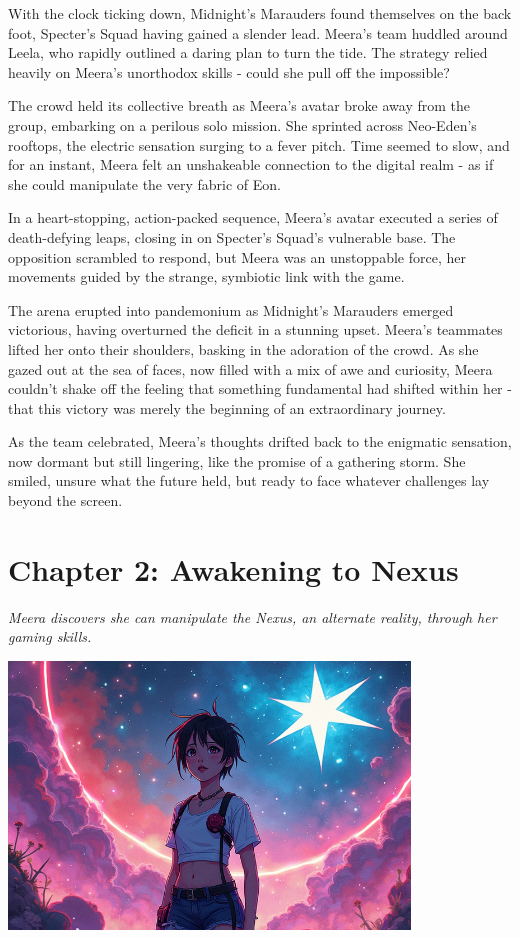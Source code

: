 \documentclass[12pt]{book}
\begin{document}
With the clock ticking down, Midnight's Marauders found themselves on
the back foot, Specter's Squad having gained a slender lead. Meera's
team huddled around Leela, who rapidly outlined a daring plan to turn
the tide. The strategy relied heavily on Meera's unorthodox skills -
could she pull off the impossible?

The crowd held its collective breath as Meera's avatar broke away from
the group, embarking on a perilous solo mission. She sprinted across
Neo-Eden's rooftops, the electric sensation surging to a fever pitch.
Time seemed to slow, and for an instant, Meera felt an unshakeable
connection to the digital realm - as if she could manipulate the very
fabric of Eon.

In a heart-stopping, action-packed sequence, Meera's avatar executed a
series of death-defying leaps, closing in on Specter's Squad's
vulnerable base. The opposition scrambled to respond, but Meera was an
unstoppable force, her movements guided by the strange, symbiotic link
with the game.

The arena erupted into pandemonium as Midnight's Marauders emerged
victorious, having overturned the deficit in a stunning upset. Meera's
teammates lifted her onto their shoulders, basking in the adoration of
the crowd. As she gazed out at the sea of faces, now filled with a mix
of awe and curiosity, Meera couldn't shake off the feeling that
something fundamental had shifted within her - that this victory was
merely the beginning of an extraordinary journey.

As the team celebrated, Meera's thoughts drifted back to the enigmatic
sensation, now dormant but still lingering, like the promise of a
gathering storm. She smiled, unsure what the future held, but ready to
face whatever challenges lay beyond the screen.


\newpage

\chapter*{Chapter 2: Awakening to Nexus}
\textit{Meera discovers she can manipulate the Nexus, an alternate reality, through her gaming skills.}

\begin{center}
\includegraphics[width=0.8\textwidth]{stories/my_story/step_6/scenes/nexus_awakening.live.png}
\end{center}
\end{document}
